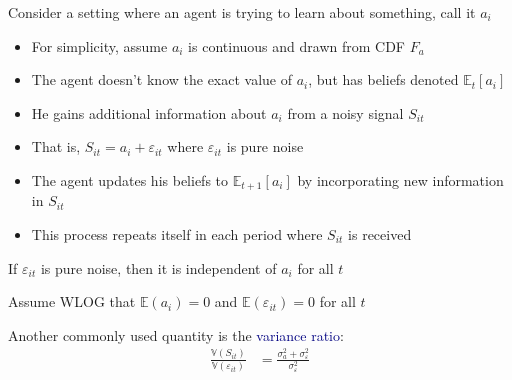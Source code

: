 \documentclass[aspectratio=169]{beamer}
\begin{document}
\begin{frame}

Consider a setting where an agent is trying to learn about something, call it $a_i$

\bigskip{}

\begin{itemize}
\itemsep1.5em
\item<2-> For simplicity, assume $a_i$ is continuous and drawn from CDF $F_a$
\item<3-> The agent doesn't know the exact value of $a_i$, but has beliefs denoted $\mathbb{E}_t [a_i]$
\item<4-> He gains additional information about $a_i$ from a noisy signal $S_{it}$
\item<5-> That is, $S_{it} = a_i + \varepsilon_{it}$ where $\varepsilon_{it}$ is pure noise
\item<6-> The agent updates his beliefs to $\mathbb{E}_{t+1} [a_i]$ by incorporating new information in $S_{it}$
\item<7-> This process repeats itself in each period where $S_{it}$ is received
\end{itemize}

\end{frame}

\begin{frame}

If $\varepsilon_{it}$ is pure noise, then it is independent of $a_i$ for all $t$

\bigskip{}

Assume WLOG that $\mathbb{E}(a_{i})=0$ and $\mathbb{E}(\varepsilon_{it})=0$ for all $t$

\bigskip{}




\end{frame}

\begin{frame}


Another commonly used quantity is the \textcolor{navy}{variance ratio}:
\begin{align*}
\frac{\mathbb{V}(S_{it})}{\mathbb{V}(\varepsilon_{it})} &= \frac{\sigma^2_a + \sigma^2_\varepsilon}{\sigma^2_{\varepsilon}}
\end{align*}


\end{frame}
\end{document}
